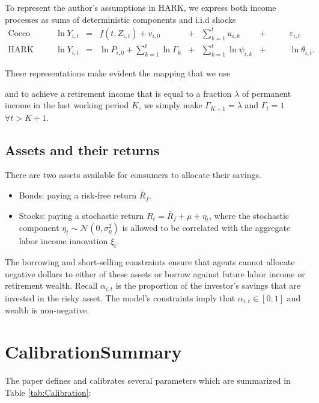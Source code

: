 \documentclass[./CGMPort.tex]{subfiles}
\begin{document}
To represent the author's assumptions in HARK, we express both income processes as sums of deterministic components and i.i.d shocks
\begin{align}
\text{Cocco et. al} &\quad& \ln Y_{i,t} &=& f(t,Z_{i,t}) + v_{i,0} &+&\sum_{k=1}^t u_{i,k} &+&\qquad \varepsilon_{i,t} \\
\text{HARK}        &\quad& \ln Y_{i,t} &=& \ln P_{i,0} + \sum_{k=1}^t \ln \Gamma_k &+&\sum_{k=1}^t \ln \psi_{i,k} &+& \qquad \ln \theta_{i,t}.
\end{align}

These representations make evident the mapping that we use

and to achieve a retirement income that is equal to a fraction $\lambda$ of 
permanent income in the last working period $K$, we simply make $\Gamma_{K+1} = 
\lambda$ and $\Gamma_{t} = 1$ $\forall t>K+1$.

\subsection{Assets and their returns}

There are two assets available for consumers to allocate their savings.
\begin{itemize}
	\item Bonds: paying a risk-free return $\bar{R}_f$.

	\item Stocks: paying a stochastic return $R_t = \bar{R}_f + \mu + \eta_t$, where the stochastic component $\eta_t \sim \mathcal{N}(0, \sigma^2_\eta)$ is allowed to be correlated with the aggregate labor income innovation $\xi_t$.
	
\end{itemize}

The borrowing and short-selling constraints ensure that agents cannot allocate negative dollars to either of these assets or borrow against future labor income or retirement wealth. Recall $\alpha_{i,t}$ is the proportion of the investor's savings that are invested in the risky asset. The model's constraints imply that $\alpha_{i,t}\in[0,1]$ and wealth is non-negative.

\hypertarget{Calibration}{}
\section{Calibration\textemdash Summary}

The paper defines and calibrates several parameters which are summarized in Table \ref{tab:Calibration}:
\end{document}
